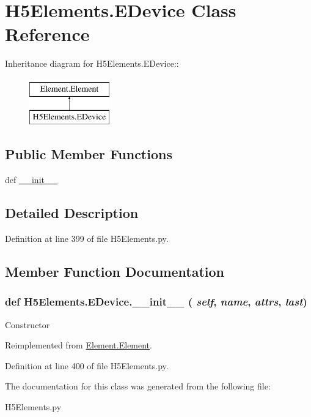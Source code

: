 \hypertarget{classH5Elements_1_1EDevice}{
\section{H5Elements.EDevice Class Reference}
\label{classH5Elements_1_1EDevice}
}
Inheritance diagram for H5Elements.EDevice::\begin{figure}[H]
\begin{center}
\leavevmode
\includegraphics[height=2cm]{classH5Elements_1_1EDevice}
\end{center}
\end{figure}
\subsection*{Public Member Functions}
\begin{DoxyCompactItemize}
\item 
def \hyperlink{classH5Elements_1_1EDevice_a2ef0d670208549cb7eeafe75af802368}{\_\-\_\-init\_\-\_\-}
\end{DoxyCompactItemize}


\subsection{Detailed Description}


Definition at line 399 of file H5Elements.py.

\subsection{Member Function Documentation}
\hypertarget{classH5Elements_1_1EDevice_a2ef0d670208549cb7eeafe75af802368}{
\subsubsection[{\_\-\_\-init\_\-\_\-}]{\setlength{\rightskip}{0pt plus 5cm}def H5Elements.EDevice.\_\-\_\-init\_\-\_\- ( {\em self}, \/   {\em name}, \/   {\em attrs}, \/   {\em last})}}
\label{classH5Elements_1_1EDevice_a2ef0d670208549cb7eeafe75af802368}
\begin{DoxyVerb}Constructor \end{DoxyVerb}
 

Reimplemented from \hyperlink{classElement_1_1Element_a359371465b7c4d21611adec7e86c3b33}{Element.Element}.

Definition at line 400 of file H5Elements.py.

The documentation for this class was generated from the following file:\begin{DoxyCompactItemize}
\item 
H5Elements.py\end{DoxyCompactItemize}
